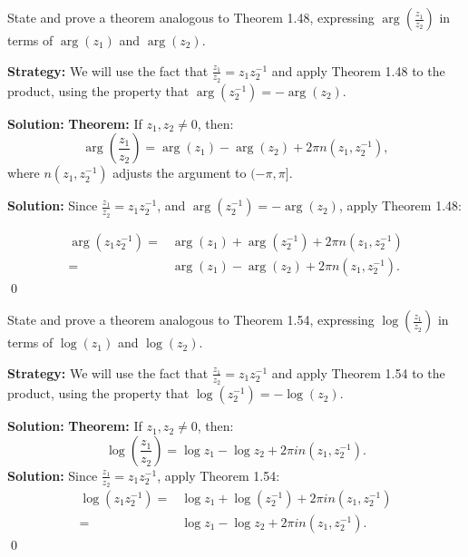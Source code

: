 \begin{problembox}
\begin{problemstatement}
State and prove a theorem analogous to Theorem 1.48, expressing \( \arg\left( \frac{z_1}{z_2} \right) \) in terms of \( \arg(z_1) \) and \( \arg(z_2) \).
\end{problemstatement}
\end{problembox}

\noindent\textbf{Strategy:} We will use the fact that $\frac{z_1}{z_2} = z_1 z_2^{-1}$ and apply Theorem 1.48 to the product, using the property that $\arg(z_2^{-1}) = -\arg(z_2)$.

\bigskip\noindent\textbf{Solution:}
\textbf{Theorem:} If \( z_1, z_2 \neq 0 \), then:
\[
\arg\left( \frac{z_1}{z_2} \right) = \arg(z_1) - \arg(z_2) + 2\pi n(z_1, z_2^{-1}),
\]
where \( n(z_1, z_2^{-1}) \) adjusts the argument to \( (-\pi, \pi] \).

\bigskip\noindent\textbf{Solution:}
Since \( \frac{z_1}{z_2} = z_1 z_2^{-1} \), and \( \arg(z_2^{-1}) = -\arg(z_2) \), apply Theorem 1.48:

\begin{align*}
\arg(z_1 z_2^{-1}) =& \arg(z_1) + \arg(z_2^{-1}) + 2\pi n(z_1, z_2^{-1}) \\
=& \arg(z_1) - \arg(z_2) + 2\pi n(z_1, z_2^{-1}).
\end{align*}\qed


\begin{problembox}
\begin{problemstatement}
State and prove a theorem analogous to Theorem 1.54, expressing \( \log\left( \frac{z_1}{z_2} \right) \) in terms of \( \log(z_1) \) and \( \log(z_2) \).
\end{problemstatement}
\end{problembox}

\noindent\textbf{Strategy:} We will use the fact that $\frac{z_1}{z_2} = z_1 z_2^{-1}$ and apply Theorem 1.54 to the product, using the property that $\log(z_2^{-1}) = -\log(z_2)$.

\bigskip\noindent\textbf{Solution:}
\textbf{Theorem:} If \( z_1, z_2 \neq 0 \), then:
\[
\log\left( \frac{z_1}{z_2} \right) = \log z_1 - \log z_2 + 2\pi i n(z_1, z_2^{-1}).
\]
\bigskip\noindent\textbf{Solution:}
Since \( \frac{z_1}{z_2} = z_1 z_2^{-1} \), apply Theorem 1.54:
\begin{align*}
\log(z_1 z_2^{-1}) =& \log z_1 + \log(z_2^{-1}) + 2\pi i n(z_1, z_2^{-1}) \\
=& \log z_1 - \log z_2 + 2\pi i n(z_1, z_2^{-1}).
\end{align*}\qed


